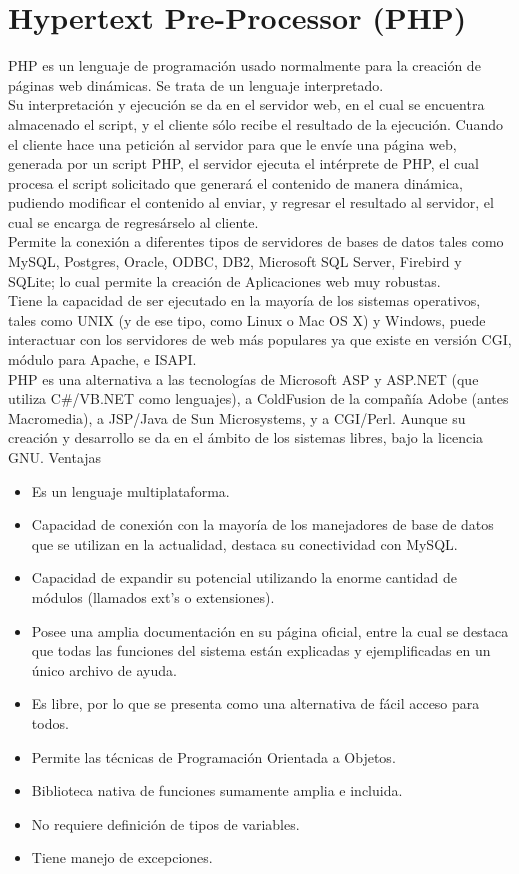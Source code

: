 \section{Hypertext Pre-Processor (PHP)}
PHP es un lenguaje de programaci\'on usado normalmente para la creaci\'on de p\'aginas web din\'amicas. Se trata de un lenguaje interpretado.\\
Su interpretaci\'on y ejecuci\'on se da en el servidor web, en el cual se encuentra almacenado el script, y el cliente s\'olo recibe el resultado de la ejecuci\'on. Cuando el cliente hace una petici\'on al servidor para que le env\'ie una p\'agina web, generada por un script PHP, el servidor ejecuta el int\'erprete de PHP, el cual procesa el script solicitado que generar\'a el contenido de manera din\'amica, pudiendo modificar el contenido al enviar, y regresar el resultado al servidor, el cual se encarga de regres\'arselo al cliente.\\
Permite la conexi\'on a diferentes tipos de servidores de bases de datos tales como MySQL, Postgres, Oracle, ODBC, DB2, Microsoft SQL Server, Firebird y SQLite; lo cual permite la creaci\'on de Aplicaciones web muy robustas.\\
Tiene la capacidad de ser ejecutado en la mayor\'ia de los sistemas operativos, tales como UNIX (y de ese tipo, como Linux o Mac OS X) y Windows, puede interactuar con los servidores de web m\'as populares ya que existe en versi\'on CGI, m\'odulo para Apache, e ISAPI.\\
PHP es una alternativa a las tecnolog\'ias de Microsoft ASP y ASP.NET (que utiliza C\#/VB.NET como lenguajes), a ColdFusion de la compa\~n\'ia Adobe (antes Macromedia), a JSP/Java de Sun Microsystems, y a CGI/Perl. Aunque su creaci\'on y desarrollo se da en el \'ambito de los sistemas libres, bajo la licencia GNU. \cite{php}
\linebreak
Ventajas
\begin{itemize}
\item Es un lenguaje multiplataforma.
\item Capacidad de conexi\'on con la mayor\'ia de los manejadores de base de datos que se utilizan en la actualidad, destaca su conectividad con MySQL.
\item Capacidad de expandir su potencial utilizando la enorme cantidad de m\'odulos (llamados ext's o extensiones).
\item Posee una amplia documentaci\'on en su p\'agina oficial, entre la cual se destaca que todas las funciones del sistema est\'an explicadas y ejemplificadas en un \'unico archivo de ayuda.
\item Es libre, por lo que se presenta como una alternativa de f\'acil acceso para todos.
\item Permite las t\'ecnicas de Programaci\'on Orientada a Objetos.
\item Biblioteca nativa de funciones sumamente amplia e incluida.
\item No requiere definici\'on de tipos de variables.
\item Tiene manejo de excepciones.
\end{itemize}
